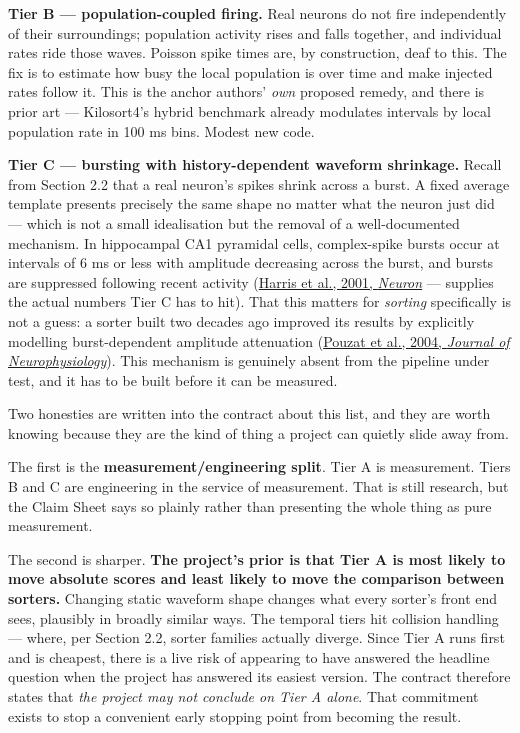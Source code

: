 \documentclass[12pt]{article}
\begin{document}
\textbf{Tier B --- population-coupled firing.} Real neurons do not fire independently of
their surroundings; population activity rises and falls together, and individual rates ride
those waves. Poisson spike times are, by construction, deaf to this. The fix is to estimate
how busy the local population is over time and make injected rates follow it. This is the
anchor authors' \emph{own} proposed remedy, and there is prior art --- Kilosort4's hybrid
benchmark already modulates intervals by local population rate in 100 ms bins. Modest new
code.

\textbf{Tier C --- bursting with history-dependent waveform shrinkage.} Recall from Section
2.2 that a real neuron's spikes shrink across a burst. A fixed average template presents
precisely the same shape no matter what the neuron just did --- which is not a small
idealisation but the removal of a well-documented mechanism. In hippocampal CA1 pyramidal
cells, complex-spike bursts occur at intervals of 6 ms or less with amplitude decreasing
across the burst, and bursts are suppressed following recent activity
(\href{https://doi.org/10.1016/S0896-6273(01)00447-0}{Harris et al., 2001, \emph{Neuron}} ---
supplies the actual numbers Tier C has to hit). That this matters for \emph{sorting}
specifically is not a guess: a sorter built two decades ago improved its results by
explicitly modelling burst-dependent amplitude attenuation
(\href{https://doi.org/10.1152/jn.00227.2003}{Pouzat et al., 2004, \emph{Journal of
Neurophysiology}}). This mechanism is genuinely absent from the pipeline under test, and it
has to be built before it can be measured.

Two honesties are written into the contract about this list, and they are worth knowing
because they are the kind of thing a project can quietly slide away from.

The first is the \textbf{measurement/engineering split}. Tier A is measurement. Tiers B and C
are engineering in the service of measurement. That is still research, but the Claim Sheet
says so plainly rather than presenting the whole thing as pure measurement.

The second is sharper. \textbf{The project's prior is that Tier A is most likely to move
absolute scores and least likely to move the comparison between sorters.} Changing static
waveform shape changes what every sorter's front end sees, plausibly in broadly similar ways.
The temporal tiers hit collision handling --- where, per Section 2.2, sorter families
actually diverge. Since Tier A runs first and is cheapest, there is a live risk of appearing
to have answered the headline question when the project has answered its easiest version.
The contract therefore states that \emph{the project may not conclude on Tier A alone}. That
commitment exists to stop a convenient early stopping point from becoming the result.
\end{document}
